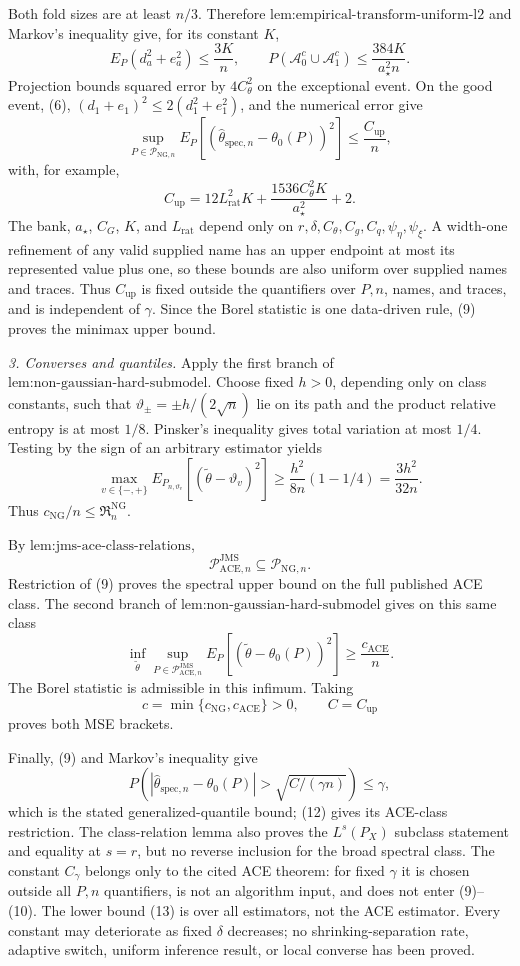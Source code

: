 Both fold sizes are at least \(n/3\).  Therefore \(\text{lem:empirical-transform-uniform-l2}\) and Markov's inequality give, for its constant \(K\),
\[
 E_P(d_a^2+e_a^2)\le\frac{3K}{n},
 \qquad
 P(\mathcal A_0^c\cup\mathcal A_1^c)
 \le\frac{384K}{a_{\star}^2n}. \tag{8}
\]
Projection bounds squared error by \(4C_{\theta}^2\) on the exceptional event.  On the good event, (6), \((d_1+e_1)^2\le2(d_1^2+e_1^2)\), and the numerical error give
\[
 \sup_{P\in\mathcal P_{\mathrm{NG},n}}
 E_P[(\widehat\theta_{\mathrm{spec},n}-\theta_0(P))^2]
 \le\frac{C_{\mathrm{up}}}{n}, \tag{9}
\]
with, for example,
\[
 C_{\mathrm{up}}
 =12L_{\mathrm{rat}}^2K
 +\frac{1536C_{\theta}^2K}{a_{\star}^2}+2. \tag{10}
\]
The bank, \(a_{\star}\), \(C_G\), \(K\), and \(L_{\mathrm{rat}}\) depend only on \(r,\delta,C_{\theta},C_g,C_q,\psi_{\eta},\psi_{\xi}\).  A width-one refinement of any valid supplied name has an upper endpoint at most its represented value plus one, so these bounds are also uniform over supplied names and traces.  Thus \(C_{\mathrm{up}}\) is fixed outside the quantifiers over \(P,n\), names, and traces, and is independent of \(\gamma\).  Since the Borel statistic is one data-driven rule, (9) proves the minimax upper bound.

\emph{3. Converses and quantiles.}  Apply the first branch of \(\text{lem:non-gaussian-hard-submodel}\).  Choose fixed \(h>0\), depending only on class constants, such that \(\vartheta_{\pm}=\pm h/(2\sqrt n)\) lie on its path and the product relative entropy is at most \(1/8\).  Pinsker's inequality gives total variation at most \(1/4\).  Testing by the sign of an arbitrary estimator yields
\[
 \max_{v\in\{-,+\}}
 E_{P_{n,\vartheta_v}}[(\widetilde\theta-\vartheta_v)^2]
 \ge\frac{h^2}{8n}(1-1/4)
 =\frac{3h^2}{32n}. \tag{11}
\]
Thus \(c_{\mathrm{NG}}/n\le\mathfrak R_n^{\mathrm{NG}}\).

By \(\text{lem:jms-ace-class-relations}\),
\[
 \mathcal P_{\mathrm{ACE},n}^{\mathrm{JMS}}
 \subseteq\mathcal P_{\mathrm{NG},n}. \tag{12}
\]
Restriction of (9) proves the spectral upper bound on the full published ACE class.  The second branch of \(\text{lem:non-gaussian-hard-submodel}\) gives on this same class
\[
 \inf_{\widetilde\theta}
 \sup_{P\in\mathcal P_{\mathrm{ACE},n}^{\mathrm{JMS}}}
 E_P[(\widetilde\theta-\theta_0(P))^2]
 \ge\frac{c_{\mathrm{ACE}}}{n}. \tag{13}
\]
The Borel statistic is admissible in this infimum.  Taking
\[
 c=\min\{c_{\mathrm{NG}},c_{\mathrm{ACE}}\}>0,
 \qquad C=C_{\mathrm{up}}
\]
proves both MSE brackets.

Finally, (9) and Markov's inequality give
\[
 P\left(
 |\widehat\theta_{\mathrm{spec},n}-\theta_0(P)|
 >\sqrt{C/(\gamma n)}
 \right)\le\gamma,
\]
which is the stated generalized-quantile bound; (12) gives its ACE-class restriction.  The class-relation lemma also proves the \(L^s(P_X)\) subclass statement and equality at \(s=r\), but no reverse inclusion for the broad spectral class.  The constant \(C_{\gamma}\) belongs only to the cited ACE theorem: for fixed \(\gamma\) it is chosen outside all \(P,n\) quantifiers, is not an algorithm input, and does not enter (9)--(10).  The lower bound (13) is over all estimators, not the ACE estimator.  Every constant may deteriorate as fixed \(\delta\) decreases; no shrinking-separation rate, adaptive switch, uniform inference result, or local converse has been proved.